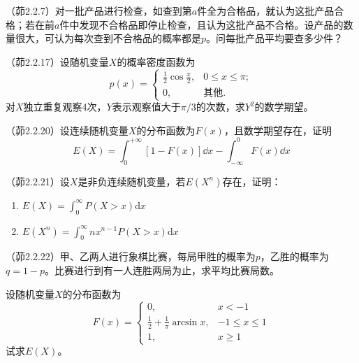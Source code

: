 \begin{problemset}[错题记录]
    \item （茆2.2.7）对一批产品进行检查，如查到第$a$件全为合格品，就认为这批产品合格；若在前$a$件中发现不合格品即停止检查，且认为这批产品不合格。设产品的数量很大，可认为每次查到不合格品的概率都是$p$。问每批产品平均要查多少件？
    \item （茆2.2.17）设随机变量$X$的概率密度函数为
    \[ p(x)=\begin{cases}
            \frac{1}{2} \cos \frac{x}{2}, & 0 \leq x \leq \pi; \\
            0,                            & \text{其他}.
        \end{cases} \]
    对$X$独立重复观察4次，$Y$表示观察值大于$\pi/3$的次数，求$Y^2$的数学期望。
    \item （茆2.2.20）设连续随机变量$X$的分布函数为$F(x)$，且数学期望存在，证明
    \[ E(X) = \int_{0}^{+\infty}[1-F(x)] \dd  x-\int_{-\infty}^{0} F(x) \dd  x \]
    \item （茆2.2.21）设$X$是非负连续随机变量，若$E(X^n)$存在，证明：\begin{enumerate}
        \item $E(X)=\int_0^{\infty}P(X>x) \mathrm{d}x$
        \item $E(X^n)=\int_0^{\infty}n x^{n-1}P(X>x) \mathrm{d}x$
    \end{enumerate}
    \item （茆2.2.22）甲、乙两人进行象棋比赛，每局甲胜的概率为$p$，乙胜的概率为$q=1-p$。比赛进行到有一人连胜两局为止，求平均比赛局数。
    \item 设随机变量$X$的分布函数为
    \[ F(x)=\begin{cases}
            0,                                  & x<-1         \\
            \frac{1}{2}+\frac{1}{\pi}\arcsin x, & -1\le x\le 1 \\
            1,                                  & x\ge 1
        \end{cases} \]
    试求$E(X)$。
\end{problemset}
